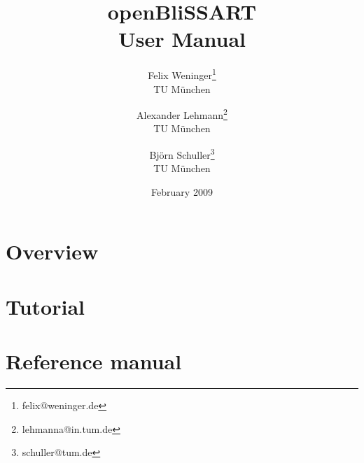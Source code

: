 \documentclass[a4paper,11pt]{article}
\author{
    Felix Weninger\thanks{felix@weninger.de}\\TU M\"unchen
    \and Alexander Lehmann\thanks{lehmanna@in.tum.de}\\TU M\"unchen
    \and Bj\"orn Schuller\thanks{schuller@tum.de}\\TU M\"unchen
}
\date{February 2009}
\title{
    openBliSSART\\[0.5cm]
    User Manual
}
\begin{document}
\maketitle


\newpage


\tableofcontents


\newpage


\section{Overview}
\label{section:Overview}



\newpage


\section{Tutorial}
\label{section:Tutorial}



\newpage


\section{Reference manual}
\label{section:RefManual}



\clearpage




\end{document}
